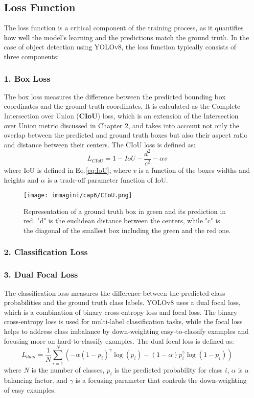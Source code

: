 \subsection{Loss Function}
The loss function is a critical component of the training process, as it quantifies how well the model's learning and the predictions match the ground truth. In the case of object detection using YOLOv8, the loss function typically consists of three components:

\subsubsection{1. Box Loss}
The box loss measures the difference between the predicted bounding box coordinates and the ground truth coordinates. It is calculated as the Complete Intersection over Union (\textbf{CIoU}) loss, which is an extension of the Intersection over Union metric discussed in Chapter 2, and takes into account not only the overlap between the predicted and ground truth boxes but also their aspect ratio and distance between their centers. The CIoU loss is defined as:
\begin{equation}
    L_{CIoU} = 1 - IoU - \dfrac{d^2}{c^2} - \alpha v
\end{equation}
where IoU is defined in Eq.\ref{eq:IoU}, where $v$ is a function of the boxes widths and heights and $\alpha$ is a trade-off parameter function of IoU. 

\begin{figure}[!ht]
    \centering
    \texttt{[image: immagini/cap6/CIoU.png]}
    \caption{Representation of a ground truth box in green and its prediction in red. "d" is the euclidean distance between the centers, while "c" is the diagonal of the smallest box including the green and the red one.}
    \label{fig:CIoU}
\end{figure}

\subsubsection{2. Classification Loss}

\subsubsection{3. Dual Focal Loss}
The classification loss measures the difference between the predicted class probabilities and the ground truth class labels. YOLOv8 uses a dual focal loss, which is a combination of binary cross-entropy loss and focal loss. The binary cross-entropy loss is used for multi-label classification tasks, while the focal loss helps to address class imbalance by down-weighting easy-to-classify examples and focusing more on hard-to-classify examples.
The dual focal loss is defined as:
\begin{equation}
    L_{dual} = \dfrac{1}{N} \sum_{i=1}^{N} \left( -\alpha (1 - p_i)^{\gamma} \log(p_i) - (1 - \alpha) p_i^{\gamma} \log(1 - p_i) \right)
\end{equation}
where $N$ is the number of classes, $p_i$ is the predicted probability for class $i$, $\alpha$ is a balancing factor, and $\gamma$ is a focusing parameter that controls the down-weighting of easy examples.
